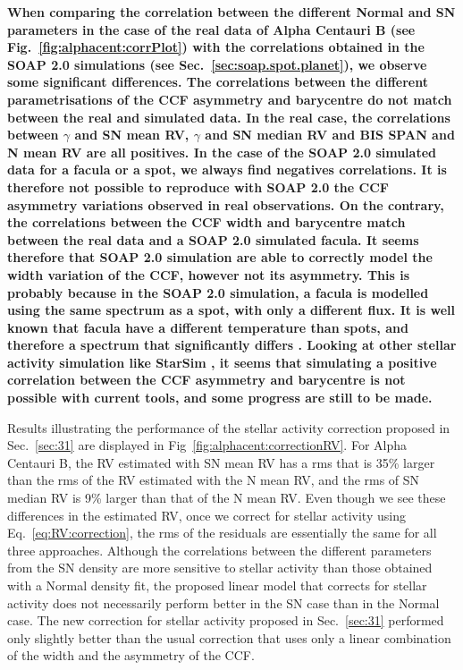 \documentclass{aa}
\begin{document}
{\bf When comparing the correlation between the different Normal and SN parameters in the case of the real data of Alpha Centauri B (see Fig.~\ref{fig:alphacent:corrPlot}) with the correlations obtained in the SOAP 2.0 simulations (see Sec.~\ref{sec:soap.spot.planet}), we observe some significant differences. The correlations between the different parametrisations of the CCF asymmetry and barycentre do not match between the real and simulated data. In the real case, the correlations between $\gamma$ and SN mean RV, $\gamma$ and SN median RV and BIS SPAN and N mean RV are all positives. In the case of the SOAP 2.0 simulated data for a facula or a spot, we always find negatives correlations. It is therefore not possible to reproduce with SOAP 2.0 the CCF asymmetry variations observed in real observations. On the contrary, the correlations between the CCF width and barycentre match between the real data and a SOAP 2.0 simulated facula. It seems therefore that SOAP 2.0 simulation are able to correctly model the width variation of the CCF, however not its asymmetry. This is probably because in the SOAP 2.0 simulation, a facula is modelled using the same spectrum as a spot, with only a different flux. It is well known that facula have a different temperature than spots, and therefore a spectrum that significantly differs \citep[e.g.][]{Cavallini-1985a}. Looking at other stellar activity simulation like StarSim \citep[][]{Herrero:2016aa}, it seems that simulating a positive correlation between the CCF asymmetry and barycentre is not possible with current tools, and some progress are still to be made.}

Results illustrating the performance of the stellar activity correction proposed in Sec.~\ref{sec:31} are displayed in Fig~\ref{fig:alphacent:correctionRV}. 
For Alpha Centauri B, the RV estimated with SN mean RV has a rms that is 35\% larger than the rms of the RV estimated with the N mean RV, and the rms of SN median RV is 9\% larger than that of the N mean RV.
Even though we see these differences in the estimated RV, once we correct for stellar activity using Eq.~\eqref{eq:RV:correction}, 
the rms of the residuals are essentially the same for all three approaches.
Although the correlations between the different parameters from the SN density are more sensitive to stellar activity than those obtained with a Normal density fit,
the proposed linear model that corrects for stellar activity does not necessarily perform better in the SN case than in the Normal case. 
The new correction for stellar activity proposed in Sec.~\ref{sec:31} performed only slightly better than the usual correction that uses only a linear combination of the width and the asymmetry of the CCF.
\end{document}
